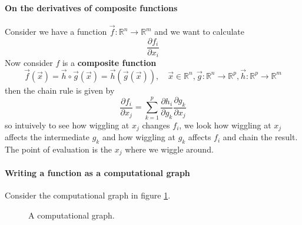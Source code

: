 \paragraph*{On the derivatives of composite functions} Consider we have a function
$\vec{f}: \mathbb{R}^n \rightarrow \mathbb{R}^m$ and we want to calculate
\begin{equation}
    \frac{\partial f_i}{\partial x_i}
\end{equation}
Now consider $f$ is a \textbf{composite function}
\begin{equation}
    \vec{f}(\vec{x}) = \vec{h} \circ \vec{g}(\vec{x}) = \vec{h}(\vec{g}(\vec{x})), \quad \vec{x} \in \mathbb{R}^n, \vec{g}: \mathbb{R}^n \rightarrow \mathbb{R}^p, \vec{h}: \mathbb{R}^p \rightarrow \mathbb{R}^m
\end{equation}
then the chain rule is given by
\begin{equation}
    \frac{\partial f_i}{\partial x_j} = \sum_{k=1}^{p} \frac{\partial h_i}{\partial g_k} \frac{\partial g_k}{\partial x_j}
\end{equation}
so intuively to see how wiggling at $x_j$ changes $f_i$, we look how wiggling at $x_j$ affects the
intermediate $g_k$ and how wiggling at $g_k$ affects $f_i$ and chain the result. The point of
evaluation is the $x_j$ where we wiggle around.

\paragraph*{Writing a function as a computational graph} 
Consider the computational graph in figure \ref{fig:comp_graph}.

\begin{figure}[!htb]
    \centering
    
    \caption{A computational graph.}
    \label{fig:comp_graph}
\end{figure}


